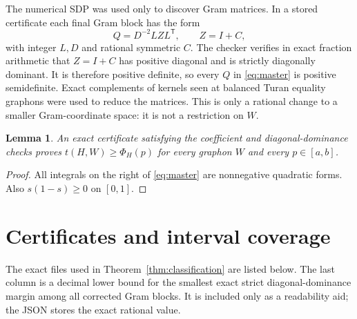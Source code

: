 \documentclass[11pt]{article}
\newtheorem{lemma}[theorem]{Lemma}
\begin{document}
The numerical SDP was used only to discover Gram matrices.  In a stored
certificate each final Gram block has the form
\[
             Q=D^{-2}LZL^{\mathsf T},\qquad Z=I+C,
\]
with integer $L,D$ and rational symmetric $C$.  The checker verifies in
exact fraction arithmetic that $Z=I+C$ has positive diagonal and is strictly
diagonally dominant.  It is therefore positive definite, so every $Q$ in
\eqref{eq:master} is positive semidefinite.  Exact complements of kernels
seen at balanced Turan equality graphons were used to reduce the matrices.
This is only a rational change to a smaller Gram-coordinate space: it is
not a restriction on $W$.

\begin{lemma}\label{lem:interval}
An exact certificate satisfying the coefficient and diagonal-dominance
checks proves $t(H,W)\geq\Phi_H(p)$ for every graphon $W$ and every
$p\in[a,b]$.
\end{lemma}

\begin{proof}
All integrals on the right of \eqref{eq:master} are nonnegative quadratic
forms.  Also $s(1-s)\geq0$ on $[0,1]$.
\end{proof}

\section{Certificates and interval coverage}

The exact files used in Theorem~\ref{thm:classification} are listed below.
The last column is a decimal lower bound for the smallest exact strict
diagonal-dominance margin among all corrected Gram blocks.  It is included
only as a readability aid; the JSON stores the exact rational value.
\end{document}
